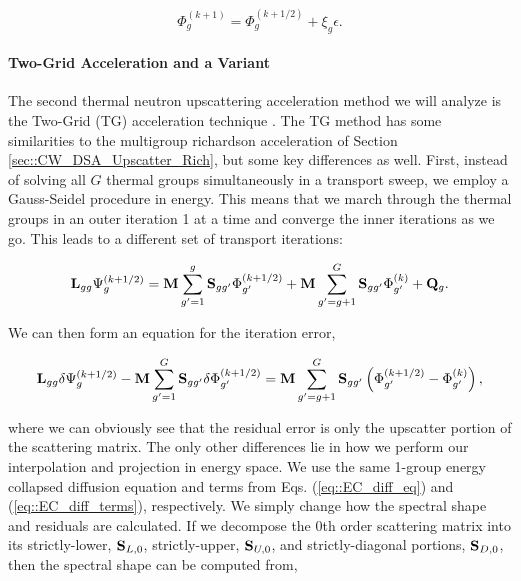 \documentclass[11pt]{article}
\begin{document}
\begin{equation}
\label{eq::rich_update}
\Phi_g^{(k+1)} =  \Phi_g^{(k+1/2)} + \xi_g  \epsilon.
\end{equation}

\paragraph{Two-Grid Acceleration and a Variant}
\label{sec::CW_DSA_Upscatter_TG}

The second thermal neutron upscattering acceleration method we will analyze is the Two-Grid (TG) acceleration technique \cite{adams1993two}. The TG method has some similarities to the multigroup richardson acceleration of Section \ref{sec::CW_DSA_Upscatter_Rich}, but some key differences as well. First, instead of solving all $G$ thermal groups simultaneously in a transport sweep, we employ a Gauss-Seidel procedure in energy. This means that we march through the thermal groups in an outer iteration 1 at a time and converge the inner iterations as we go. This leads to a different set of transport iterations:

\begin{equation}
\label{eq::GS_it}
{\bf L}_{gg} \Psi_g^{(k+1/2)} = {\bf M} \sum_{g'=1}^g {\bf S}_{g g'} \Phi_{g'}^{(k+1/2)} + {\bf M} \sum_{g'=g+1}^G {\bf S}_{g g'} \Phi_{g'}^{(k)} + {\bf Q}_g .
\end{equation}

We can then form an equation for the iteration error,

\begin{equation}
\label{eq::TG_full_eq_err}
{\bf L}_{gg} \delta \Psi_g^{(k+1/2)} - {\bf M} \sum_{g'=1}^G {\bf S}_{g g'} \delta \Phi_{g'}^{(k+1/2)}=  {\bf M} \sum_{g'=g+1}^G {\bf S}_{g g'}\left( \Phi_{g'}^{(k+1/2)}- \Phi_{g'}^{(k)} \right) ,
\end{equation}

\noindent where we can obviously see that the residual error is only the upscatter portion of the scattering matrix. The only other differences lie in how we perform our interpolation and projection in energy space. We use the same 1-group energy collapsed diffusion equation and terms from Eqs. (\ref{eq::EC_diff_eq}) and (\ref{eq::EC_diff_terms}), respectively. We simply change how the spectral shape and residuals are calculated. If we decompose the 0th order scattering matrix into its strictly-lower, ${\bf S}_{L,0}$, strictly-upper, ${\bf S}_{U,0}$, and strictly-diagonal portions, ${\bf S}_{D,0}$, then the spectral shape can be computed from,
\end{document}
